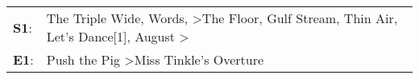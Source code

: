 \begin{supertabular}{p{0.03\textwidth}p{0.92\textwidth}}
 \textbf{S1}:  &  The Triple Wide\textsuperscript{}, \enspace Words\textsuperscript{}, \textsuperscript{} \textgreater \enspace The Floor\textsuperscript{}, \enspace Gulf Stream\textsuperscript{}, \enspace Thin Air\textsuperscript{}, \enspace Let's Dance[1]\textsuperscript{}, \enspace August\textsuperscript{} \textgreater {}\textsuperscript{}  \enspace  \\
 \textbf{E1}:  &                                                                                                                                                                                                                                                                   Push the Pig\textsuperscript{} \textgreater \enspace Miss Tinkle's Overture\textsuperscript{}  \enspace  \\
\end{supertabular}
